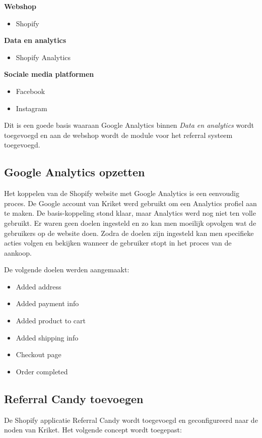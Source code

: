 \textbf{Webshop}
\begin{itemize}
	\item Shopify
\end{itemize}

\textbf{Data en analytics}
\begin{itemize}
	\item Shopify Analytics
\end{itemize}

\textbf{Sociale media platformen}
\begin{itemize}
	\item Facebook
	\item Instagram
\end{itemize}

Dit is een goede basis waaraan Google Analytics binnen \emph{Data en analytics} wordt toegevoegd en aan de webshop wordt de module voor het referral systeem toegevoegd.

\subsection{Google Analytics opzetten} \label{sec:google-analytics-opzetten}
Het koppelen van de Shopify website met Google Analytics is een eenvoudig proces. De Google account van Kriket werd gebruikt om een Analytics profiel aan te maken. De basis-koppeling stond klaar, maar Analytics werd nog niet ten volle gebruikt. Er waren geen doelen ingesteld en zo kan men moeilijk opvolgen wat de gebruikers op de website doen. Zodra de doelen zijn ingesteld kan men specifieke acties volgen en bekijken wanneer de gebruiker stopt in het proces van de aankoop.

De volgende doelen werden aangemaakt:
\begin{itemize}
	\item Added address
	\item Added payment info
	\item Added product to cart
	\item Added shipping info
	\item Checkout page
	\item Order completed
\end{itemize}

\subsection{Referral Candy toevoegen} \label{sec:referral-candy-toevoegen}
De Shopify applicatie Referral Candy wordt toegevoegd en geconfigureerd naar de noden van Kriket. Het volgende concept wordt toegepast:


